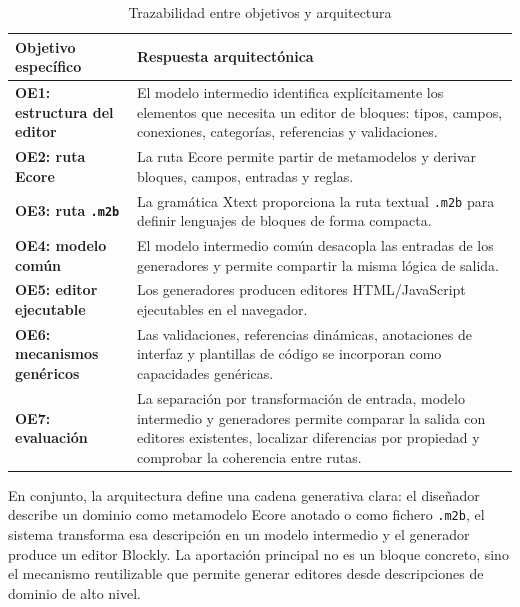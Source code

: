 \begin{table}[h]
  \centering
  \begin{tabular}{|L{0.23\textwidth}|L{0.65\textwidth}|}
    \hline
    Objetivo específico & Respuesta arquitectónica \\
    \hline
    \textbf{OE1: estructura del editor} & El modelo intermedio identifica explícitamente los elementos que
    necesita un editor de bloques: tipos, campos, conexiones, categorías,
    referencias y validaciones. \\
    \textbf{OE2: ruta Ecore} & La ruta Ecore permite partir de metamodelos y
    derivar bloques, campos, entradas y reglas. \\
    \textbf{OE3: ruta \texttt{.m2b}} & La gramática Xtext proporciona la ruta textual \texttt{.m2b}
    para definir lenguajes de bloques de forma compacta. \\
    \textbf{OE4: modelo común} & El modelo intermedio común desacopla las entradas de los generadores
    y permite compartir la misma lógica de salida. \\
    \textbf{OE5: editor ejecutable} & Los generadores producen editores HTML/JavaScript ejecutables en el
    navegador. \\
    \textbf{OE6: mecanismos genéricos} & Las validaciones, referencias dinámicas, anotaciones de interfaz y
    plantillas de código se incorporan como capacidades genéricas. \\
    \textbf{OE7: evaluación} & La separación por transformación de entrada, modelo intermedio y
    generadores permite comparar la salida con editores existentes, localizar
    diferencias por propiedad y comprobar la coherencia entre rutas. \\
    \hline
  \end{tabular}
  \caption{Trazabilidad entre objetivos y arquitectura}
  \label{tab:trazabilidad-arquitectura}
\end{table}

En conjunto, la arquitectura define una cadena generativa clara: el diseñador
describe un dominio como metamodelo Ecore anotado o como fichero \texttt{.m2b},
el sistema transforma esa descripción en un modelo intermedio y el generador
produce un editor Blockly. La aportación principal no es un bloque concreto,
sino el mecanismo reutilizable que permite generar editores desde descripciones
de dominio de alto nivel.

